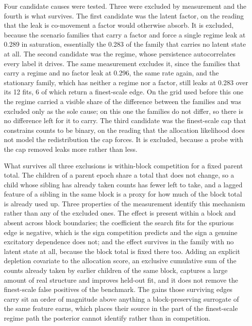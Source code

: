 Four candidate causes were tested. Three were excluded by measurement and the
fourth is what survives. The first candidate was the latent factor, on the
reading that the leak is co-movement a factor would otherwise absorb. It is
excluded, because the scenario families that carry a factor and force a single
regime leak at 0.289 in saturation, essentially the 0.283 of the family that
carries no latent state at all. The second candidate was the regime, whose
persistence autocorrelates every label it drives. The same measurement excludes
it, since the families that carry a regime and no factor leak at 0.296, the same
rate again, and the stationary family, which has neither a regime nor a factor,
still leaks at 0.283 over its 12 fits, 6 of which return a finest-scale edge. On
the grid used before this one the regime carried a visible share of the
difference between the families and was excluded only as the sole cause; on this
one the families do not differ, so there is no difference left for it to carry.
The third candidate was the finest-scale cap that constrains counts to be binary,
on the reading that the allocation likelihood does not model the redistribution
the cap forces. It is excluded, because a probe with the cap removed leaks more
rather than less.

What survives all three exclusions is within-block competition for a fixed parent
total. The children of a parent epoch share a total that does not change, so a
child whose sibling has already taken counts has fewer left to take, and a lagged
feature of a sibling in the same block is a proxy for how much of the block total
is already used up. Three properties of the measurement identify this mechanism
rather than any of the excluded ones. The effect is present within a block and
absent across block boundaries; the coefficient the search fits for the spurious
edge is negative, which is the sign competition predicts and the sign a genuine
excitatory dependence does not; and the effect survives in the family with no
latent state at all, because the block total is fixed there too. Adding an
explicit depletion covariate to the allocation score, an exclusive cumulative sum
of the counts already taken by earlier children of the same block, captures a
large amount of real structure and improves held-out fit, and it does not remove
the finest-scale false positives of the benchmark. The gains those surviving
edges carry sit an order of magnitude above anything a block-preserving surrogate
of the same feature earns, which places their source in the part of the
finest-scale regime path the posterior cannot identify rather than in
competition.


